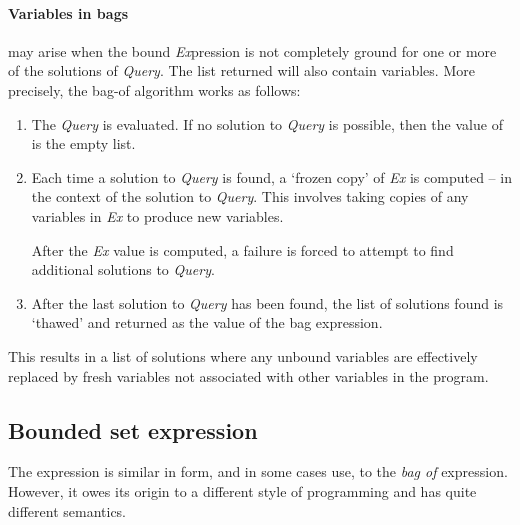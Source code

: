 \paragraph{Variables in bags}
may arise when the bound \emph{Ex}pression is not completely ground for one or more of the solutions of \emph{Query}. The list returned will also contain variables. More precisely, the bag-of algorithm works as follows:
\begin{enumerate}
\item
The \emph{Query} is evaluated. If no solution to \emph{Query} is possible, then the value of  is the empty list.
\item
Each time a solution to \emph{Query} is found, a `frozen copy' of \emph{Ex} is computed -- in the context of the solution to \emph{Query}. This involves taking copies of any variables in \emph{Ex} to produce new variables.

After the \emph{Ex} value is computed, a failure is forced to attempt to find additional solutions to \emph{Query}.
\item
After the last solution to \emph{Query} has been found, the list of solutions found is `thawed' and returned as the value of the bag expression.
\end{enumerate}
This results in a list of solutions where any unbound variables are effectively replaced by fresh variables not associated with other variables in the program.

\subsection{Bounded set expression}
\label{expression:bounded}
The  expression is similar in form, and in some cases use, to the \emph{bag of} expression. However, it owes its origin to a different style of programming and has quite different semantics.

